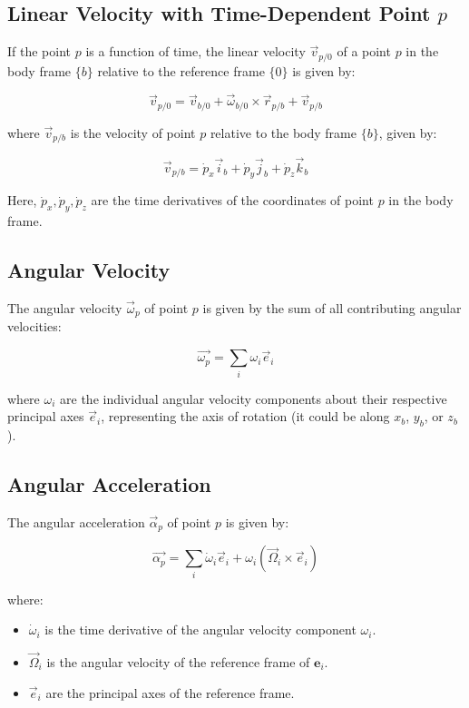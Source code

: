 \subsection{Linear Velocity with Time-Dependent Point \( p \)}

If the point \( p \) is a function of time, the linear velocity \( \vec{v}_{p/0} \) of a point \( p \) in the body frame \( \{b\} \) relative to the reference frame \( \{0\} \) is given by:

\[
\vec{v}_{p/0} = \vec{v}_{b/0} + \vec{\omega}_{b/0} \times \vec{r}_{p/b} + \vec{v}_{p/b}
\]

where \( \vec{v}_{p/b} \) is the velocity of point \( p \) relative to the body frame \( \{b\} \), given by:

\[
\vec{v}_{p/b} = \dot{p}_x \vec{i}_b + \dot{p}_y \vec{j}_b + \dot{p}_z \vec{k}_b
\]

Here, \( \dot{p}_x, \dot{p}_y, \dot{p}_z \) are the time derivatives of the coordinates of point \( p \) in the body frame.
    


\subsection{Angular Velocity}

The angular velocity \( \vec{\omega}_{p} \) of point \( p \) is given by the sum of all contributing angular velocities:

\[
\vec{\omega_{p}} = \sum_{i} \omega_i \vec{e}_i
\]

where \( \omega_i \) are the individual angular velocity components about their respective principal axes \( \vec{e}_i \), representing the axis of rotation (it could be along $x_b$, $y_b$, or $z_b$).

\subsection{Angular Acceleration}

The angular acceleration \( \vec{\alpha}_{p} \) of point \( p \) is given by:

\[
\vec{\alpha_{p}} = \sum_{i} \dot{\omega}_i \vec{e}_i + \omega_i (\vec{\Omega}_i \times \vec{e}_i)
\]

where:
\begin{itemize}
    \item \( \dot{\omega}_i \) is the time derivative of the angular velocity component \( \omega_i \).
    \item \( \vec{\Omega}_i \) is the angular velocity of the reference frame of \( \mathbf{e}_i \).
    \item \( \vec{e}_i \) are the principal axes of the reference frame.
\end{itemize}

